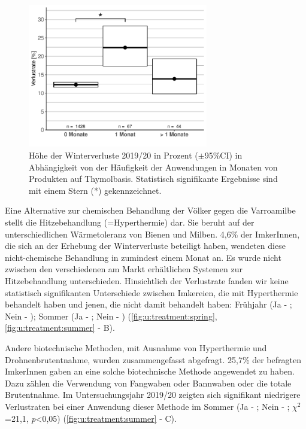\begin{figure}[H]
  \centering
  \includegraphics[keepaspectratio,width=0.7\textwidth]{project-U-wintersterblichkeit/figures/plot_treatment_thymol_grouped}
  \caption{Höhe der Winterverluste 2019/20 in Prozent (\(\pm\)95\%CI) in Abhängigkeit von der Häufigkeit der Anwendungen in Monaten von Produkten auf Thymolbasis. Statistisch signifikante Ergebnisse sind mit einem Stern (*) gekennzeichnet.}
  \label{fig:u:treatment:thymol:grouped}
\end{figure}


Eine Alternative zur chemischen Behandlung der Völker gegen die Varroamilbe stellt die Hitzebehandlung (=Hyperthermie) dar. Sie beruht auf der unterschiedlichen Wärmetoleranz von Bienen und Milben. 4,6\% der ImkerInnen, die sich an der Erhebung der Winterverluste beteiligt haben, wendeten diese nicht-chemische Behandlung in zumindest einem Monat an. Es wurde nicht zwischen den verschiedenen am Markt erhältlichen Systemen zur Hitzebehandlung unterschieden. Hinsichtlich der Verlustrate fanden wir keine statistisch signifikanten Unterschiede zwischen Imkereien, die mit Hyperthermie behandelt haben und jenen, die nicht damit behandelt haben: Frühjahr (Ja - ; Nein - ); Sommer (Ja - ; Nein - ) (\cref{fig:u:treatment:spring}, \cref{fig:u:treatment:summer} - B).

\newpage 


Andere biotechnische Methoden, mit Ausnahme von Hyperthermie und Drohnenbrutentnahme, wurden zusammengefasst abgefragt. 25,7\% der befragten ImkerInnen gaben an eine solche biotechnische Methode angewendet zu haben. Dazu zählen die Verwendung von Fangwaben oder Bannwaben oder die totale Brutentnahme.
\newline
Im Untersuchungsjahr 2019/20 zeigten sich signifikant niedrigere Verlustraten bei einer Anwendung dieser Methode im Sommer (Ja - ; Nein - ; $\chi^{2}$=21,1, \textit{p}<0,05) (\cref{fig:u:treatment:summer} - C).

